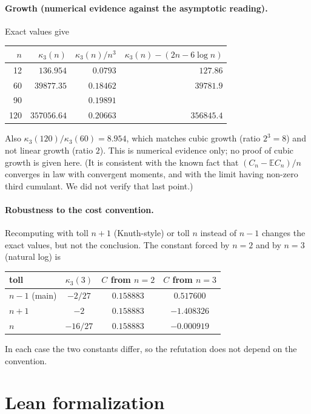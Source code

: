 \documentclass[11pt]{article}
\theoremstyle{definition}
\theoremstyle{plain}
\begin{document}
\paragraph{Growth (numerical evidence against the asymptotic reading).} Exact values give
\begin{center}
\begin{tabular}{r r r r}
\hline
$n$ & $\kappa_3(n)$ & $\kappa_3(n)/n^3$ & $\kappa_3(n)-(2n-6\log n)$ \\
\hline
12 & $136.954$ & $0.0793$ & $127.86$ \\
60 & $39877.35$ & $0.18462$ & $39781.9$ \\
90 & & $0.19891$ & \\
120 & $357056.64$ & $0.20663$ & $356845.4$ \\
\hline
\end{tabular}
\end{center}
Also $\kappa_3(120)/\kappa_3(60)=8.954$, which matches cubic growth (ratio $2^3=8$) and not linear growth (ratio $2$).
This is numerical evidence only; no proof of cubic growth is given here. (It is consistent with the known fact that
$(C_n-\mathbb{E}C_n)/n$ converges in law with convergent moments, and with the limit having non-zero third cumulant. We did
not verify that last point.)

\paragraph{Robustness to the cost convention.} Recomputing with toll $n+1$ (Knuth-style) or toll $n$ instead of $n-1$
changes the exact values, but not the conclusion. The constant forced by $n=2$ and by $n=3$ (natural log) is
\begin{center}
\begin{tabular}{l c c c}
\hline
toll & $\kappa_3(3)$ & $C$ from $n=2$ & $C$ from $n=3$ \\
\hline
$n-1$ (main) & $-2/27$ & $0.158883$ & $0.517600$ \\
$n+1$ & $-2$ & $0.158883$ & $-1.408326$ \\
$n$ & $-16/27$ & $0.158883$ & $-0.000919$ \\
\hline
\end{tabular}
\end{center}
In each case the two constants differ, so the refutation does not depend on the convention.

\section{Lean formalization}
\end{document}
